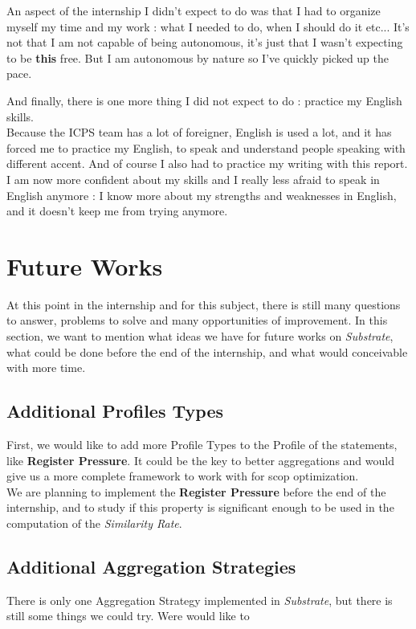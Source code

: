 \documentclass[paper=a4, fontsize=11.5pt]{scrartcl}
\numberwithin{equation}{section}        %
\numberwithin{figure}{section}          %
\numberwithin{table}{section}               %
\begin{document}
        An aspect of the internship I didn't expect to do was that I had to organize myself
        my time and my work : what I needed to do, when I should do it etc... It's not that I
        am not capable of being autonomous, it's just that I wasn't expecting to be
        \textbf{this} free. But I am autonomous by nature so I've quickly picked up the pace.

        And finally, there is one more thing I did not expect to do : practice my English skills.\\
        Because the ICPS team has a lot of foreigner, English is used a lot, and it has forced
        me to practice my English, to speak and understand people speaking with different accent.
        And of course I also had to practice my writing with this report.
        I am now more confident about my skills and I really less afraid to speak in English
        anymore : I know more about my strengths and weaknesses in English, and it doesn't
        keep me from trying anymore.


\section{Future Works}
\label{sec:future_works}
At this point in the internship and for this subject, there is still many
questions to answer, problems to solve and many opportunities of improvement.
In this section, we want to mention what ideas we have for future works on \textit{Substrate},
what could be done before the end of the internship, and what would conceivable with more time.
    \subsection{Additional Profiles Types}
        First, we would like to add more Profile Types to the Profile of the statements,
        like \textbf{Register Pressure}. It could be the key to better aggregations and would
        give us a more complete framework to work with for scop optimization.\\

        We are planning to implement the \textbf{Register Pressure} before the end of the
        internship, and to study if this property is significant enough to be used in the
        computation of the \textit{Similarity Rate}.
    \subsection{Additional Aggregation Strategies}
        There is only one Aggregation Strategy implemented in \textit{Substrate}, but
        there is still some things we could try. Were would like to 
\end{document}
